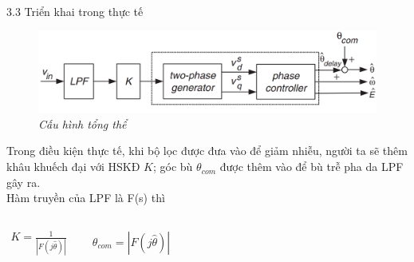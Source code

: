\documentclass[11pt]{beamer}
\renewcommand{\label}[1]{%
			\gdef\sfname{sf:##1}}%
\begin{document}
\begin{frame}[t]{3.3 Triển khai trong thực tế}
	\begin{figure}[h]
		\includegraphics[width=1\textwidth]{Fig. 11 Overall configuration.PNG}
		\caption{\centering \textit{Cấu hình tổng thể}}
		\label{fig:Cấu hình tổng thể}
	\end{figure}
	Trong điều kiện thực tế, khi bộ lọc được đưa vào để giảm nhiễu, người ta sẽ thêm khâu khuếch đại với HSKĐ $K$; góc bù $\theta_{com}$ được thêm vào để bù trễ pha da LPF gây ra.\\Hàm truyền của LPF là F(s) thì
	\begin{columns}
		\centering
		\begin{align*}
			K = \frac{1}{|F(j \hat{\theta})|}\\
		\end{align*}

		\centering
		\begin{align*}
			{\theta}_{com} = {|F(j \hat{\theta})|} \\
		\end{align*}
		
	\end{columns}
	
\end{frame}
\end{document}
